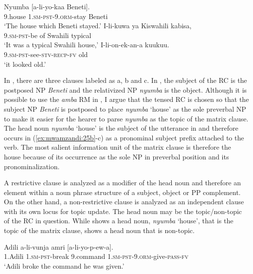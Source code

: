 \documentclass[output=paper,colorlinks,citecolor=brown]{langscibook}
\begin{document}
\ea%
    \label{ex:mwamzandi:25}
    \ea%
    \label{ex:mwamzandi:25a}
    \gll    Nyumba [a-li-yo-kaa Beneti].\\
            9.house \textsc{1.sm-pst-9.orm-}stay Beneti\\
    \glt    ‘The house which Beneti stayed.’
    \ex%
    \label{ex:mwamzandi:25b}
    \gll    I-li-kuwa ya Kiswahili kabisa,\\
            \textsc{9.sm-pst-}be of Swahili typical\\
    \glt    ‘It was a typical Swahili house,’
    \ex%
    \label{ex:mwamzandi:25c}
    \gll    I-li-on-ek-an-a kuukuu.\\
            \textsc{9.sm-pst-}see\textsc{-stv-recp-fv} old\\
    \glt    ‘it looked old.’
    \z
\z

In , there are three clauses labeled as a, b and c. In , the subject of the RC is the postposed NP \textit{Beneti} and the relativized NP \textit{nyumba} is the object. Although it is possible to use the \textit{amba} RM in , I argue that the tensed RC is chosen so that the subject NP \textit{Beneti} is postposed to place \textit{nyumba} ‘house’ as the sole preverbal NP to make it easier for the hearer to parse \textit{nyumba} as the topic of the matrix clause. The head noun \textit{nyumba} ‘house’ is the subject of the utterance in  and therefore occurs in (\ref{ex:mwamzandi:25b}-c) as a pronominal subject prefix attached to the verb. The most salient information unit of the matrix clause is therefore the house because of its occurrence as the sole NP in preverbal position and its pronominalization.

A restrictive clause is analyzed as a modifier of the head noun and therefore an element within a noun phrase structure of a subject, object or PP complement. On the other hand, a non-restrictive clause is analyzed as an independent clause with its own locus for topic update. The head noun may be the topic/non-topic of the RC in question. While  shows a head noun, \textit{nyumba} ‘house’, that is the topic of the matrix clause,  shows a head noun that is non-topic.

\ea%
    \label{ex:mwamzandi:26}
    \gll    Adili a-li-vunja amri [a-li-yo-p-ew-a].\\
            1.Adili \textsc{1.sm-pst-}break 9.command \textsc{1.sm-pst-9.orm-}give\textsc{-pass-fv}\\
    \glt    ‘Adili broke the command he was given.’
\z
\end{document}
